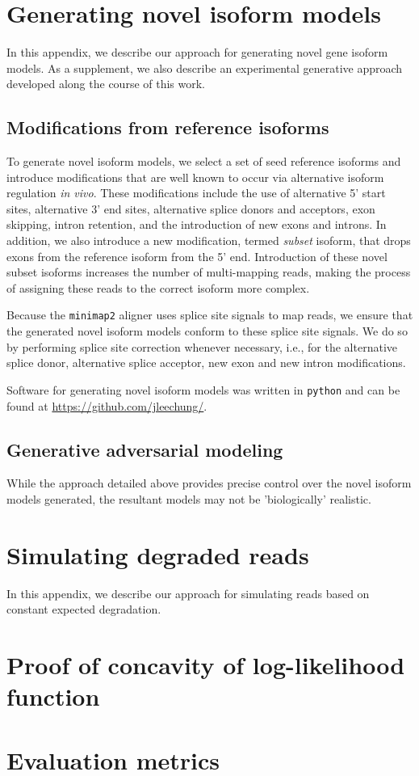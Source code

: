 
\chapter{Generating novel isoform models}

In this appendix, we describe our approach for generating novel gene isoform models. As a supplement, we also describe an experimental generative approach developed along the course of this work.   

\section{Modifications from reference isoforms}

To generate novel isoform models, we select a set of seed reference isoforms and introduce modifications that are well known to occur via alternative isoform regulation \textit{in vivo}. These modifications include the use of alternative 5' start sites, alternative 3' end sites, alternative splice donors and acceptors, exon skipping, intron retention, and the introduction of new exons and introns. In addition, we also introduce a new modification, termed \textit{subset} isoform, that drops exons from the reference isoform from the 5' end. Introduction of these novel subset isoforms increases the number of multi-mapping reads, making the process of assigning these reads to the correct isoform more complex. 


Because the \texttt{minimap2} aligner uses splice site signals to map reads, we ensure that the generated novel isoform models conform to these splice site signals. We do so by performing splice site correction whenever necessary, i.e., for the alternative splice donor, alternative splice acceptor, new exon and new intron modifications. 


Software for generating novel isoform models was written in \texttt{python} and can be found at \url{https://github.com/jleechung/}.

\section{Generative adversarial modeling}

While the approach detailed above provides precise control over the novel isoform models generated, the resultant models may not be 'biologically' realistic.  

\chapter{Simulating degraded reads}

In this appendix, we describe our approach for simulating reads based on constant expected degradation.

\chapter{Proof of concavity of log-likelihood function}

\lipsum[77]

\chapter{Evaluation metrics}

\lipsum[32]
